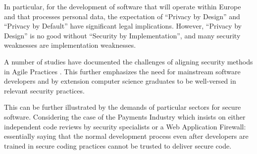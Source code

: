 \documentclass[conference]{IEEEtran}
\begin{document}
In particular, for the development of software that will operate within Europe and that processes personal data, the expectation of ``Privacy by Design'' and ``Privacy by Default'' have significant legal implications. However, ``Privacy by Design'' is no good without ``Security by Implementation'', and many security weaknesses are implementation weaknesses.

A number of studies have documented the challenges of aligning security methods in Agile Practices \cite{vanderHeijden:2018:EPS:3239235.3267426,Bartsch2011a}. This further emphasizes the need for mainstream software developers and by extension computer science graduates to be well-versed in relevant security practices.

This can be further illustrated by the demands of particular sectors for secure software. Considering the case of the Payments Industry \cite[6.6]{PCI2018b} which insists on either independent code reviews by security specialists or a Web Application Firewall: essentially saying that the normal development process even after developers are trained in secure coding practices \cite[6.5]{PCI2018b} cannot be trusted to deliver secure code. 
\end{document}
